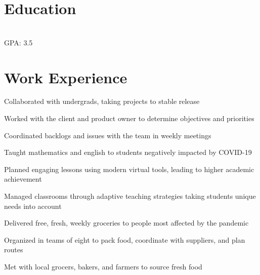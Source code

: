 \documentclass[]{deedy-resume-openfont}
\begin{document}
    
%
%
%
%
\section{Education}
\raggedright

\hfill {}\\
GPA: 3.5\\
\sectionsep
%
%
\section{Work Experience}
\hfill {}
\begin{tightemize}
	\item Collaborated with undergrads, taking projects to stable release
	\item Worked with the client and product owner to determine objectives and priorities
	\item Coordinated backlogs and issues with the team in weekly meetings
\end{tightemize}
\sectionsep
{}\hfill {}
\begin{tightemize}
	\item Taught mathematics and english to students negatively impacted by COVID-19
	\item Planned engaging lessons using modern virtual tools, leading to higher academic achievement
	\item Managed classrooms through adaptive teaching strategies taking student\textquotesingle{}s unique needs into account
\end{tightemize}
\sectionsep
{}\hfill {}
\begin{tightemize}
	\item Delivered free, fresh, weekly groceries to people most affected by the pandemic
	\item Organized in teams of eight to pack food, coordinate with suppliers, and plan routes
	\item Met with local grocers, bakers, and farmers to source fresh food
\end{tightemize}
\sectionsep
%
%
\end{document}
